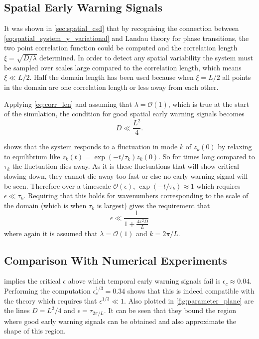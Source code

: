\subsection{Spatial Early Warning Signals}
It was shown in \cref{sec:spatial_csd} that by recognising the connection between \cref{eq:spatial_system_y_variational} and Landau theory for phase transitions, the two point
correlation function could be computed and the correlation length $\xi = \sqrt{D/\lambda}$ determined. In order to detect any spatial variability the system must be sampled over
scales large compared to the correlation length, which means $\xi \ll L/2$. Half the domain length has been used because when $\xi = L/2$ all points in the domain are one correlation
length or less away from each other.

Applying \cref{eq:corr_len} and assuming that $\lambda = \mathcal{O}(1)$, which is true at the start of the simulation, the condition for good spatial early warning signals becomes 
\begin{equation}
  \label{eq:scaling_corr}
  D \ll \frac{L^2}{4}.
\end{equation}


 shows that the system responds to a fluctuation in mode $k$ of $z_k(0)$ by relaxing to equilibrium like $z_k(t) = \exp \left(-t/\tau_k\right)z_k(0)$.
So for times long compared to $\tau_k$ the fluctuation dies away. As it is these fluctuations that will show critical slowing down, they cannot die away too fast or else no early warning signal will be
seen. Therefore over a timescale $\mathcal{O}(\epsilon)$, $\exp\left(-t/\tau_k\right) \approx 1$ which requires $\epsilon \ll \tau_k$. Requiring that this holds for wavenumbers
corresponding to the scale of the domain
(which is when $\tau_k$ is largest) gives the requirement that
\begin{equation}
  \label{eq:scaling_eps}
  \epsilon \ll \frac{1}{1 + \frac{4\pi^2D}{L}}
\end{equation}
where again it is assumed that $\lambda = \mathcal{O}(1)$ and $k = 2\pi/L$.

\subsection{Comparison With Numerical Experiments}
 implies the critical $\epsilon$ above which temporal early warning signals fail is $\epsilon_c \approx 0.04$.
Performing the computation $\epsilon_c^{1/3} = 0.34$ shows that this is indeed compatible with the theory which requires that $\epsilon^{1/3} \ll 1$.
Also plotted in \cref{fig:parameter_plane} are the  lines $D = L^2/4$ and $\epsilon = \tau_{2\pi/L}$. It can be seen that they bound
the region where good early warning signals can be obtained and also approximate the shape of this region.

